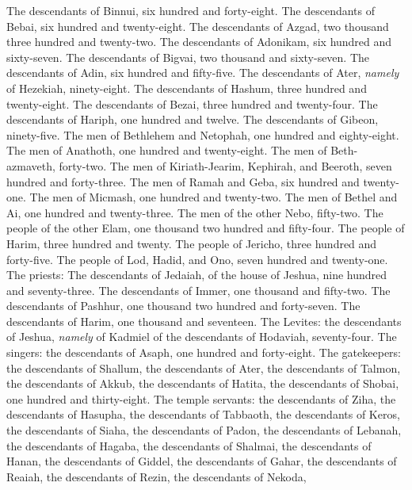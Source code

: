 \begin{biblechapter}
\verse The descendants of Binnui, six hundred and forty-eight.
\verse The descendants of Bebai, six hundred and twenty-eight.
\verse The descendants of Azgad, two thousand three hundred and twenty-two.
\verse The descendants of Adonikam, six hundred and sixty-seven.
\verse The descendants of Bigvai, two thousand and sixty-seven.
\verse The descendants of Adin, six hundred and fifty-five.
\verse The descendants of Ater, \textit{namely} of Hezekiah, ninety-eight.
\verse The descendants of Hashum, three hundred and twenty-eight.
\verse The descendants of Bezai, three hundred and twenty-four.
\verse The descendants of Hariph, one hundred and twelve.
\verse The descendants of Gibeon, ninety-five.
\verse The men of Bethlehem and Netophah, one hundred and eighty-eight.
\verse The men of Anathoth, one hundred and twenty-eight.
\verse The men of Beth-azmaveth, forty-two.
\verse The men of Kiriath-Jearim, Kephirah, and Beeroth, seven hundred and forty-three.
\verse The men of Ramah and Geba, six hundred and twenty-one.
\verse The men of Micmash, one hundred and twenty-two.
\verse The men of Bethel and Ai, one hundred and twenty-three.
\verse The men of the other Nebo, fifty-two.
\verse The people of the other Elam, one thousand two hundred and fifty-four.
\verse The people of Harim, three hundred and twenty.
\verse The people of Jericho, three hundred and forty-five.
\verse The people of Lod, Hadid, and Ono, seven hundred and twenty-one.
\verse The priests: The descendants of Jedaiah, of the house of Jeshua, nine hundred and seventy-three.
\verse The descendants of Immer, one thousand and fifty-two.
\verse The descendants of Pashhur, one thousand two hundred and forty-seven.
\verse The descendants of Harim, one thousand and seventeen.
\verse The Levites: the descendants of Jeshua, \textit{namely} of Kadmiel of the descendants of Hodaviah, seventy-four.
\verse The singers: the descendants of Asaph, one hundred and forty-eight.
\verse The gatekeepers: the descendants of Shallum, the descendants of Ater, the descendants of Talmon, the descendants of Akkub, the descendants of Hatita, the descendants of Shobai, one hundred and thirty-eight.
\verse The temple servants: the descendants of Ziha, the descendants of Hasupha, the descendants of Tabbaoth,
\verse the descendants of Keros, the descendants of Siaha, the descendants of Padon,
\verse the descendants of Lebanah, the descendants of Hagaba, the descendants of Shalmai,
\verse the descendants of Hanan, the descendants of Giddel, the descendants of Gahar,
\verse the descendants of Reaiah, the descendants of Rezin, the descendants of Nekoda,

\end{biblechapter}
